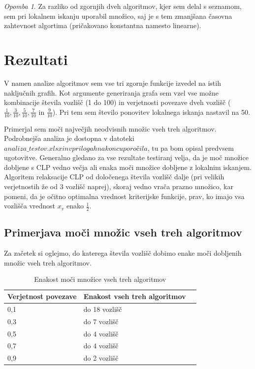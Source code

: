 \documentclass[a4paper, 12 pt]{article}
\theoremstyle{definition}
\theoremstyle{plain}
\theoremstyle{remark}
\newtheorem*{opomba}{Opomba}
\begin{document}
\begin{opomba}
Za razliko od zgornjih dveh algoritmov, kjer sem delal s seznamom, sem pri lokalnem iskanju uporabil množico, saj je s tem zmanjšana časovna zahtevnost algortima (pričakovano konstantna namesto linearne).
\end{opomba}
\newpage
\section{Rezultati} %
V namen analize algoritmov sem vse tri zgornje funkcije izvedel na istih naključnih grafih. Kot argumente generiranja grafa sem vzel vse možne kombinacije števila vozlišč (1 do 100) in verjetnosti povezave dveh vozlišč ($\frac{1}{10}, \frac{3}{10}, \frac{5}{10}, \frac{7}{10}$ in $\frac{9}{10}$). Pri tem sem število ponovitev lokalnega iskanja nastavil na 50.

Primerjal sem moči največjih neodvisnih množic vseh treh algoritmov. Podrobnejša analiza je dostopna v datoteki $\textit{analiza\_testov.xlsx} in v prilogah na koncu poročila$, tu pa bom opisal predvsem ugotovitve.  Generalno gledano za vse rezultate testiranj velja, da je moč množice dobljene s CLP vedno večja ali enaka moči množice dobljene z lokalnim iskanjem. Algoritem relaksacije CLP od določenega števila vozlišč dalje (pri velikih verjetnostih že od 3 vozlišč naprej), skoraj vedno vrača prazno množico, kar pomeni, da je očitno optimalna vrednost kriterijske funkcije, prav, ko imajo vsa vozlišča vrednost $x_v$ enako $\frac{1}{2}$.

\subsection{Primerjava moči množic vseh treh algoritmov}

Za začetek si oglejmo, do katerega števila vozlišč dobimo enake moči dobljenih množic vseh treh algoritmov.



\begin{table}[H]
\centering
\begin{tabular}{|p{2.1cm}|p{3.2cm}|p{6cm}|}
\hline
\textbf{Verjetnost povezave}  & \textbf{Enakost vseh treh algoritmov} \\ \hline
0,1    & do 18 vozlišč   \\ \hline
0,3    & do 7 vozlišč     \\ \hline
0,5    & do 4 vozlišč  \\ \hline
0,7    & do 4 vozlišč \\ \hline
0,9    & do 2 vozlišč    \\ \hline
\end{tabular}
\caption{Enakost moči množice vseh treh algoritmov}
\label{fig:enakost vseh treh} 
\end{table}
\end{document}
